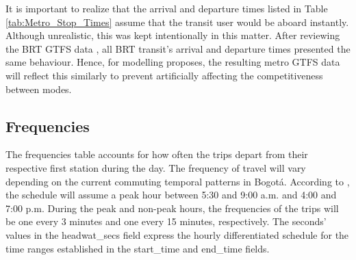 \documentclass[12pt, a4paper]{report}
\begin{document}
\begin{table}[ht]
\centering
{}
\caption{Metro stop times table.}
\label{tab:Metro_Stop_Times}
\end{table}

It is important to realize that the arrival and departure times listed in Table \ref{tab:Metro_Stop_Times} assume that the transit user would be aboard instantly. Although unrealistic, this was kept intentionally in this matter. After reviewing the BRT GTFS data \citep{transmilenios.a.GTFSEstaticos202306212023}, all BRT transit's arrival and departure times presented the same behaviour. Hence, for modelling proposes, the resulting metro GTFS data will reflect this similarly to prevent artificially affecting the competitiveness between modes.

\subsection{Frequencies}

The frequencies table accounts for how often the trips depart from their respective first station during the day. The frequency of travel will vary depending on the current commuting temporal patterns in Bogotá. According to \cite{alcaldiadebogotad.c.EncuestaMovilidad20192019}, the schedule will assume a peak hour between 5:30 and 9:00 a.m. and 4:00 and 7:00 p.m. During the peak and non-peak hours, the frequencies of the trips will be one every 3 minutes and one every 15 minutes, respectively. The seconds' values in the headwat\_secs field express the hourly differentiated schedule for the time ranges established in the start\_time and end\_time fields.
\end{document}
